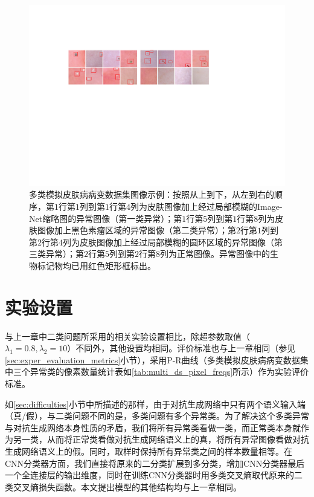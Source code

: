 \begin{figure}[h]
	\centering
	\includegraphics[width=1.0\textwidth]{figure/multi_classes_simulated_skin.pdf}
	\caption{多类模拟皮肤病病变数据集图像示例：按照从上到下，从左到右的顺序，第$1$行第$1$列到第$1$行第$4$列为皮肤图像加上经过局部模糊的Image-Net缩略图的异常图像（第一类异常）；第$1$行第$5$列到第$1$行第$8$列为皮肤图像加上黑色素瘤区域的异常图像（第二类异常）；第$2$行第$1$列到第$2$行第$4$列为皮肤图像加上经过局部模糊的圆环区域的异常图像（第三类异常）；第$2$行第$5$列到第$2$行第$8$列为正常图像。异常图像中的生物标记物均已用红色矩形框标出。}
	\label{fig:mul_classes_simulated_ds}
\end{figure}

\section{实验设置}\label{sec:multi_classes_experiment_setting}
与上一章中二类问题所采用的相关实验设置相比，除超参数取值（$\lambda_{1}=0.8,\lambda_{2}=10$）不同外，其他设置均相同。评价标准也与上一章相同（参见\ref{sec:exper_evaluation_metrics}小节），采用P-R曲线（多类模拟皮肤病病变数据集中三个异常类的像素数量统计表如\ref{tab:multi_ds_pixel_freqs}所示）作为实验评价标准。

如\ref{sec:difficulties}小节中所描述的那样，由于对抗生成网络中只有两个语义输入端（真/假），与二类问题不同的是，多类问题有多个异常类。为了解决这个多类异常与对抗生成网络本身性质的矛盾，我们将所有异常类看做一类，而正常类本身就作为另一类，从而将正常类看做对抗生成网络语义上的真，将所有异常图像看做对抗生成网络语义上的假。同时，取样时保持所有异常类之间的样本数量相等。在CNN分类器方面，我们直接将原来的二分类扩展到多分类，增加CNN分类器最后一个全连接层的输出维度，同时在训练CNN分类器时用多类交叉熵取代原来的二类交叉熵损失函数。本文提出模型的其他结构均与上一章相同。

